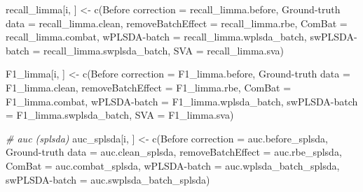 \documentclass[
]{book}
\newenvironment{Shaded}{\begin{snugshade}}{\end{snugshade}}
\newcommand{\AttributeTok}[1]{\textcolor[rgb]{0.77,0.63,0.00}{#1}}
\newcommand{\CommentTok}[1]{\textcolor[rgb]{0.56,0.35,0.01}{\textit{#1}}}
\newcommand{\FunctionTok}[1]{\textcolor[rgb]{0.00,0.00,0.00}{#1}}
\newcommand{\NormalTok}[1]{#1}
\newcommand{\OtherTok}[1]{\textcolor[rgb]{0.56,0.35,0.01}{#1}}
\newcommand{\StringTok}[1]{\textcolor[rgb]{0.31,0.60,0.02}{#1}}
\begin{document}
\begin{Shaded}
\begin{Highlighting}[]
\NormalTok{  recall\_limma[i, ] }\OtherTok{\textless{}{-}} \FunctionTok{c}\NormalTok{(}\StringTok{\textasciigrave{}}\AttributeTok{Before correction}\StringTok{\textasciigrave{}} \OtherTok{=}\NormalTok{ recall\_limma.before, }
                         \StringTok{\textasciigrave{}}\AttributeTok{Ground{-}truth data}\StringTok{\textasciigrave{}} \OtherTok{=}\NormalTok{ recall\_limma.clean,}
                         \StringTok{\textasciigrave{}}\AttributeTok{removeBatchEffect}\StringTok{\textasciigrave{}} \OtherTok{=}\NormalTok{ recall\_limma.rbe,}
                         \AttributeTok{ComBat =}\NormalTok{ recall\_limma.combat,}
                         \StringTok{\textasciigrave{}}\AttributeTok{wPLSDA{-}batch}\StringTok{\textasciigrave{}} \OtherTok{=}\NormalTok{ recall\_limma.wplsda\_batch,}
                         \StringTok{\textasciigrave{}}\AttributeTok{swPLSDA{-}batch}\StringTok{\textasciigrave{}} \OtherTok{=}\NormalTok{ recall\_limma.swplsda\_batch,}
                         \AttributeTok{SVA =}\NormalTok{ recall\_limma.sva)}
  
\NormalTok{  F1\_limma[i, ] }\OtherTok{\textless{}{-}} \FunctionTok{c}\NormalTok{(}\StringTok{\textasciigrave{}}\AttributeTok{Before correction}\StringTok{\textasciigrave{}} \OtherTok{=}\NormalTok{ F1\_limma.before, }
                     \StringTok{\textasciigrave{}}\AttributeTok{Ground{-}truth data}\StringTok{\textasciigrave{}} \OtherTok{=}\NormalTok{ F1\_limma.clean,}
                     \StringTok{\textasciigrave{}}\AttributeTok{removeBatchEffect}\StringTok{\textasciigrave{}} \OtherTok{=}\NormalTok{ F1\_limma.rbe,}
                     \AttributeTok{ComBat =}\NormalTok{ F1\_limma.combat,}
                     \StringTok{\textasciigrave{}}\AttributeTok{wPLSDA{-}batch}\StringTok{\textasciigrave{}} \OtherTok{=}\NormalTok{ F1\_limma.wplsda\_batch,}
                     \StringTok{\textasciigrave{}}\AttributeTok{swPLSDA{-}batch}\StringTok{\textasciigrave{}} \OtherTok{=}\NormalTok{ F1\_limma.swplsda\_batch,}
                     \AttributeTok{SVA =}\NormalTok{ F1\_limma.sva)}
  
  \CommentTok{\# auc (splsda)}
\NormalTok{  auc\_splsda[i, ] }\OtherTok{\textless{}{-}} \FunctionTok{c}\NormalTok{(}\StringTok{\textasciigrave{}}\AttributeTok{Before correction}\StringTok{\textasciigrave{}} \OtherTok{=}\NormalTok{ auc.before\_splsda, }
                       \StringTok{\textasciigrave{}}\AttributeTok{Ground{-}truth data}\StringTok{\textasciigrave{}} \OtherTok{=}\NormalTok{ auc.clean\_splsda, }
                       \StringTok{\textasciigrave{}}\AttributeTok{removeBatchEffect}\StringTok{\textasciigrave{}} \OtherTok{=}\NormalTok{ auc.rbe\_splsda, }
                       \AttributeTok{ComBat =}\NormalTok{ auc.combat\_splsda, }
                       \StringTok{\textasciigrave{}}\AttributeTok{wPLSDA{-}batch}\StringTok{\textasciigrave{}} \OtherTok{=}\NormalTok{ auc.wplsda\_batch\_splsda, }
                       \StringTok{\textasciigrave{}}\AttributeTok{swPLSDA{-}batch}\StringTok{\textasciigrave{}} \OtherTok{=}\NormalTok{ auc.swplsda\_batch\_splsda)}
  

\end{Highlighting}
\end{Shaded}
\end{document}
